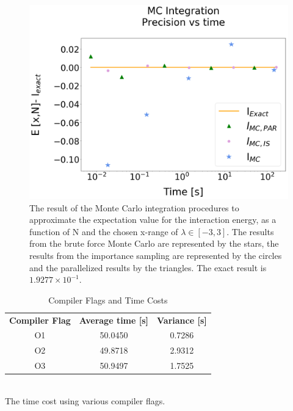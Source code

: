\documentclass[%
reprint,
amsmath,amssymb,
aps,
]{revtex4-1}
\begin{document}
\begin{figure}[!h]
	\includegraphics[scale = 0.22]{MC_integration_PT.png}
	\caption{\label{mc} The result of the Monte Carlo integration procedures to approximate the expectation value for the interaction energy, as a function of N and the chosen x-range of $\lambda \in[-3,3]$. The results from the brute force Monte Carlo are represented by the stars, the results from the importance sampling are represented by the circles and the parallelized results by the triangles. The exact result is $1.9277\times 10^{-1}$. }
\end{figure}


\begin{table}[H]
	\caption{Compiler Flags and Time Costs}
	\begin{tabular}{|c|c|c|}
		\hline 
		\hspace{1mm} \textbf{Compiler Flag} \hspace{1mm} & \hspace{1mm}\textbf{Average time [s]} \hspace{1mm} & \textbf{Variance [s]} \\
		O1& 50.0450 &0.7286 \\
		O2& 49.8718 &2.9312 \\ 
		O3& 50.9497 & 1.7525\\
		\hline 
	\end{tabular} \\ 
	[3pt]\label{compilerflags} \centering The time cost using various compiler flags.
\end{table}

\twocolumngrid
\end{document}
